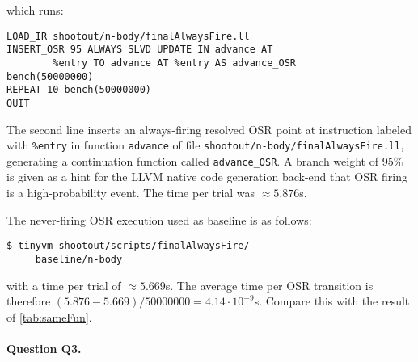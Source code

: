 \noindent which runs:

\begin{small}
\begin{verbatim}
LOAD_IR shootout/n-body/finalAlwaysFire.ll
INSERT_OSR 95 ALWAYS SLVD UPDATE IN advance AT 
        %entry TO advance AT %entry AS advance_OSR
bench(50000000)
REPEAT 10 bench(50000000)
QUIT
\end{verbatim}
\end{small}

\noindent The second line inserts an always-firing resolved OSR point at instruction labeled with {\tt \%entry} in function {\tt advance} of file {\tt shootout/n-body/finalAlwaysFire.ll}, generating a continuation function called {\tt advance\_OSR}. A branch weight of 95\% is given as a hint for the LLVM native code generation back-end that OSR firing is a high-probability event. The time per trial was $\approx5.876$s.

The never-firing OSR execution used as baseline is as follows:
\begin{small}
\begin{verbatim}
$ tinyvm shootout/scripts/finalAlwaysFire/
     baseline/n-body
\end{verbatim}
\end{small}

\noindent with a time per trial of $\approx5.669$s. The average time per OSR transition is therefore $(5.876-5.669)/50000000=4.14\cdot 10^{-9}$s. Compare this with the result of \ref{tab:sameFun}.

\paragraph{Question Q3.} 



